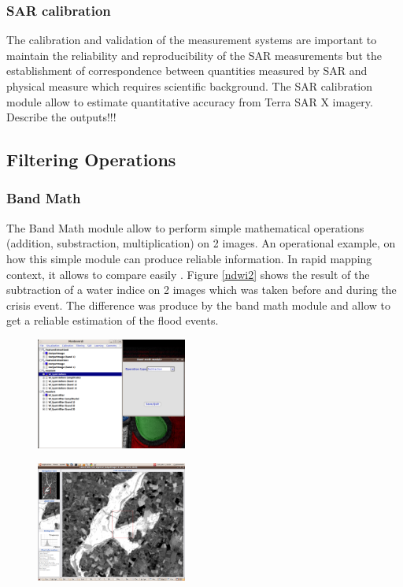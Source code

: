 \subsubsection{SAR calibration}

The calibration and validation of the measurement systems are important to maintain the
reliability and reproducibility of the SAR measurements but the establishment of correspondence between quantities measured 
by SAR and physical measure which requires scientific background. The SAR calibration module allow to estimate quantitative accuracy
from Terra SAR X imagery.
Describe the outputs!!!

\subsection{Filtering Operations}
\subsubsection{Band Math}
The Band Math module allow to perform simple mathematical operations (addition, substraction, multiplication) on 2 images. 
An operational example, on how this simple module can produce reliable information.
In rapid mapping context, it allows to compare easily . Figure \ref{ndwi2} shows the result of the subtraction of a water indice on 2 images
which was taken before and during the crisis event. 
The difference was produce by the band math module and allow to get a reliable estimation of the flood events.

\begin{figure}
   \center
   \includegraphics[width=0.44\textwidth]{../Art/MonteverdiImages/monteverdi_band_math_substraction.png}
   \label{fig:concatenate}
\end{figure}

\begin{figure}
   \center
   \includegraphics[width=0.44\textwidth]{../Art/MonteverdiImages/monteverdi_NDWI2_substraction.png}
   \label{fig:ndwi2}
\end{figure}

